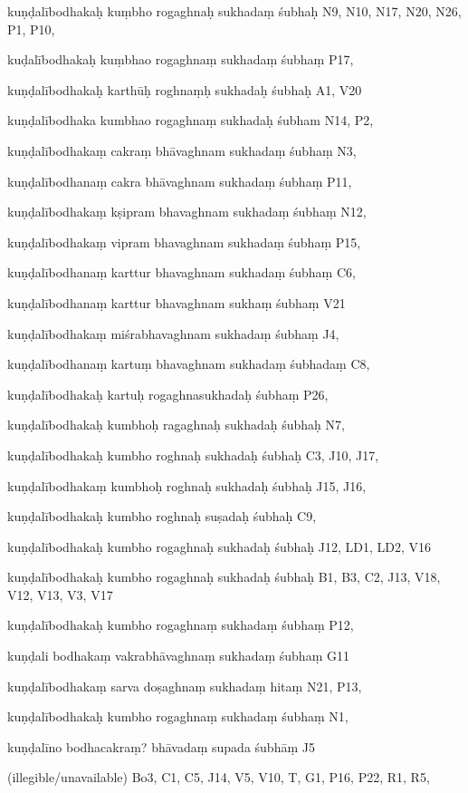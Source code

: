 \begin{ekdosis}
\begin{marma}[hp01_055]
\begin{marma}[hp02_009]
\begin{marma}[hp02_011]
\begin{marma}[hp02_67ab]
\item[kuṇḍalībodhakaḥ kuṃbho rogaghnaḥ sukhadaṃ śubhaḥ] N9, N10, N17, N20,  N26, P1, P10, 
\item[kuḍalībodhakaḥ kuṃbhao rogaghnaṃ sukhadaṃ śubhaṃ] P17,
\item[kuṇḍalībodhakaḥ karthūḥ roghnaṃḥ sukhadaḥ śubhaḥ] A1, V20
\item[kuṇḍalībodhaka kumbhao rogaghnaṃ sukhadaḥ śubham] N14, P2,
\item[kuṇḍalībodhakaṃ cakraṃ bhāvaghnam sukhadaṃ śubhaṃ] N3,
\item[kuṇḍalībodhanaṃ cakra bhāvaghnam sukhadaṃ śubhaṃ] P11,  
\item[kuṇḍalībodhakaṃ kṣipram bhavaghnam sukhadaṃ śubhaṃ] N12,
\item[kuṇḍalībodhakaṃ vipram bhavaghnam sukhadaṃ śubhaṃ] P15,
\item[kuṇḍalībodhanaṃ karttur bhavaghnam sukhadaṃ śubhaṃ] C6,
\item[kuṇḍalībodhanaṃ karttur bhavaghnam sukhaṃ śubhaṃ] V21
\item[kuṇḍalībodhakaṃ miśrabhavaghnam sukhadaṃ śubhaṃ] J4,
\item[kuṇḍalībodhanaṃ kartuṃ bhavaghnam sukhadaṃ śubhadaṃ] C8,
\item[kuṇḍalībodhakaḥ kartuḥ rogaghnasukhadaḥ śubhaṃ] P26, 
\item[kuṇḍalībodhakaḥ kumbhoḥ ragaghnaḥ sukhadaḥ śubhaḥ] N7, 
\item[kuṇḍalībodhakaḥ kumbho roghnaḥ sukhadaḥ śubhaḥ] C3, J10, J17, 
\item[kuṇḍalībodhakaṃ kumbhoḥ roghnaḥ sukhadaḥ śubhaḥ] J15, J16,
\item[kuṇḍalībodhakaḥ kumbho roghnaḥ suṣadaḥ śubhaḥ] C9, 
\item[kuṇḍalībodhakaḥ kumbho rogaghnaḥ sukhadaḥ śubhaḥ] J12, LD1, LD2, V16 
\item[kuṇḍalībodhakaḥ kumbho rogaghnaḥ sukhadaḥ śubhaḥ] B1, B3, C2, J13, V18, V12, V13, V3, V17 
\item[kuṇḍalībodhakaḥ kumbho rogaghnaṃ sukhadaṃ śubhaṃ] P12,
\item[kuṇḍali bodhakaṃ vakrabhāvaghnaṃ sukhadaṃ śubhaṃ] G11
\item[kuṇḍalībodhakaṃ sarva doṣaghnaṃ sukhadaṃ hitaṃ] N21, P13, 
\item[kuṇḍalībodhakaḥ kumbho rogaghnaṃ sukhadaṃ śubhaṃ] N1, 
\item[kuṇḍalīno bodhacakraṃ? bhāvadaṃ supada śubhāṃ] J5
\item[(illegible/unavailable)] Bo3, C1, C5, J14, V5, V10, T, G1, P16, P22, R1, R5,
  \begin{description}


\end{description}
\end{marma}
\end{marma}
\end{marma}
\end{marma}
\end{ekdosis}
